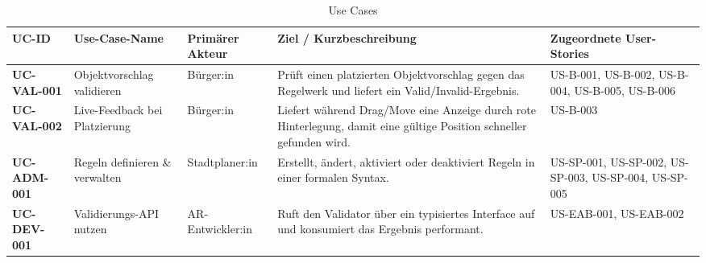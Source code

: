 \begin{landscape}
\begin{table}[!h]
\begin{center}
\bgroup
\def\arraystretch{1.5}
    \begin{tabular}{| p{3cm} | p{5cm} | p{3cm} | p{6cm} | p{3cm} |}
    \hline
UC-ID & Use-Case-Name & Primärer Akteur & Ziel / Kurzbeschreibung & Zugeordnete User-Stories \\
\hline\hline

\textbf{UC-VAL-001} & Objektvorschlag validieren & Bürger:in & Prüft einen platzierten Objektvorschlag gegen das Regelwerk und liefert ein Valid/Invalid-Ergebnis. & US-B-001, US-B-002, US-B-004, US-B-005, US-B-006 \\
\hline
\textbf{UC-VAL-002} & Live-Feedback bei Platzierung & Bürger:in & Liefert während Drag/Move eine Anzeige durch rote Hinterlegung, damit eine gültige Position schneller gefunden wird. & US-B-003 \\
\hline
\textbf{UC-ADM-001} & Regeln definieren \& verwalten & Stadtplaner:in & Erstellt, ändert, aktiviert oder deaktiviert Regeln in einer formalen Syntax. & US-SP-001, US-SP-002, US-SP-003, US-SP-004, US-SP-005 \\
\hline
\textbf{UC-DEV-001} & Validierungs-API nutzen & AR-Entwickler:in & Ruft den Validator über ein typisiertes Interface auf und konsumiert das Ergebnis performant. & US-EAB-001, US-EAB-002 \\
\hline
\end{tabular}
    \egroup
    
\caption{Use Cases}
\label{tab:Use Cases}
\end{center}
\end{table}
\end{landscape}
\FloatBarrier

